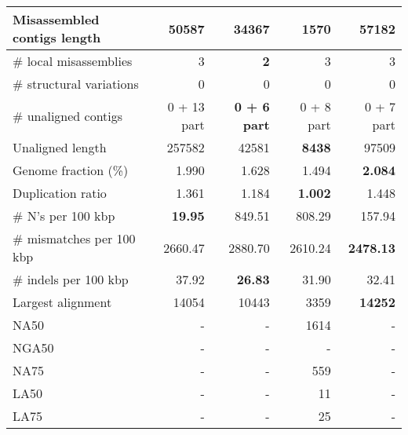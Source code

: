 \documentclass[12pt,a4paper]{article}
\begin{document}
\begin{table}[ht]
\begin{center}
\begin{tabular}{|l*{4}{|r}|}
Misassembled contigs length & 50587 & 34367 & {\bf 1570} & 57182 \\ \hline
\# local misassemblies & 3 & {\bf 2} & 3 & 3 \\ \hline
\# structural variations & 0 & 0 & 0 & 0 \\ \hline
\# unaligned contigs & 0 + 13 part & {\bf 0 + 6 part} & 0 + 8 part & 0 + 7 part \\ \hline
Unaligned length & 257582 & 42581 & {\bf 8438} & 97509 \\ \hline
Genome fraction (\%) & 1.990 & 1.628 & 1.494 & {\bf 2.084} \\ \hline
Duplication ratio & 1.361 & 1.184 & {\bf 1.002} & 1.448 \\ \hline
\# N's per 100 kbp & {\bf 19.95} & 849.51 & 808.29 & 157.94 \\ \hline
\# mismatches per 100 kbp & 2660.47 & 2880.70 & 2610.24 & {\bf 2478.13} \\ \hline
\# indels per 100 kbp & 37.92 & {\bf 26.83} & 31.90 & 32.41 \\ \hline
Largest alignment & 14054 & 10443 & 3359 & {\bf 14252} \\ \hline
NA50 & - & - & 1614 & - \\ \hline
NGA50 & - & - & - & - \\ \hline
NA75 & - & - & 559 & - \\ \hline
LA50 & - & - & 11 & - \\ \hline
LA75 & - & - & 25 & - \\ \hline
\end{tabular}
\end{center}
\end{table}
\end{document}
